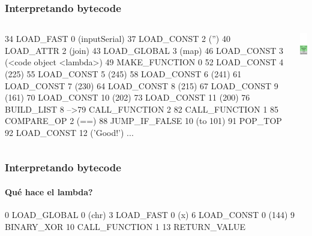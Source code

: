 \documentclass[9pt, notes=hide]{beamer}
\begin{document}
\begin{frame}[fragile]
    \frametitle{Interpretando bytecode}
        \begin{columns}[T]
            \begin{column}{.8\textwidth}
\begin{python}
   34  LOAD_FAST          0 (inputSerial)
   37  LOAD_CONST         2 ('')
   40  LOAD_ATTR          2 (join)
   43  LOAD_GLOBAL        3 (map)
   46  LOAD_CONST         3 (<code object <lambda>)
   49  MAKE_FUNCTION      0
   52  LOAD_CONST         4 (225)
   55  LOAD_CONST         5 (245)
   58  LOAD_CONST         6 (241)
   61  LOAD_CONST         7 (230)
   64  LOAD_CONST         8 (215)
   67  LOAD_CONST         9 (161)
   70  LOAD_CONST        10 (202)
   73  LOAD_CONST        11 (200)
   76  BUILD_LIST         8
-->79  CALL_FUNCTION      2
   82  CALL_FUNCTION      1
   85  COMPARE_OP         2 (==)
   88  JUMP_IF_FALSE     10 (to 101)
   91  POP_TOP
   92  LOAD_CONST        12 ('Good!')
   ...
\end{python}

            \end{column}
            \begin{column}{.3\textwidth}
                \includegraphics[width=2.5cm]{images/stack-3.png}
            \end{column}
        \end{columns}

\end{frame}


\begin{frame}[fragile]
    \frametitle{Interpretando bytecode}
    \framesubtitle{Qué hace el lambda?}

\begin{python}
   0  LOAD_GLOBAL          0 (chr)
   3  LOAD_FAST            0 (x)
   6  LOAD_CONST           0 (144)
   9  BINARY_XOR
  10 CALL_FUNCTION         1
  13 RETURN_VALUE
\end{python}

\vspace{0.5cm}

\end{frame}
\end{document}
